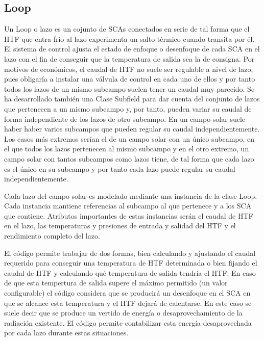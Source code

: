 \subsection{Loop}
\label{loop}

Un Loop o lazo es un cojunto de SCAs conectados en serie de tal forma que el HTF que entra frío al lazo experimenta un salto térmico cuando transita por él. El sistema de control ajusta el estado de enfoque o desenfoque de cada SCA en el lazo con el fin de conseguir que la temperatura de salida sea la de consigna. Por motivos de económicos, el caudal de HTF no suele ser regulable a nivel de lazo, pues obligaría a instalar una válvula de control en cada uno de ellos y por tanto todos los lazos de un mismo subcampo suelen tener un caudal muy parecido. Se ha desarrollado también una Clase Subfield para dar cuenta del conjunto de lazos que pertenecen a un mismo subcampo y, por tanto, pueden variar su caudal de forma independiente de los lazos de otro subcampo. En un campo solar suele haber haber varios subcampos que pueden regular su caudal independientemente. Los casos más extremos serían el de un campo solar con un único subcampo, en el que todos los lazos pertenecen al mismo subcampo y en el otro extremo, un campo solar con tantos subcampos como lazos tiene, de tal forma que cada lazo es el único en su subcampo y por tanto cada lazo puede regular su caudal independientemente. 

Cada lazo del campo solar es modelado mediante una instancia de la clase Loop. Cada instancia mantiene referencias al subcampo al que pertenece y a los SCA que contiene. Atributos importantes de estas instancias serán el caudal de HTF en el lazo, las temperaturas y presiones de entrada y salidad del HTF y el rendimiento completo del lazo. 

El código permite trabajar de dos formas, bien calculando y ajustando el caudal requerido para conseguir una temperatura de HTF determinada o bien fijando el caudal de HTF y calculando qué temperatura de salida tendría el HTF. En caso de que esta tempertura de salida supere el máximo permitido (un valor configurable) el código considera que se producirá un desenfoque en el SCA en que se alcance esta temperatura y el HTF dejará de calentarse. En este caso se suele decir que se produce un vertido de energía o desaprovechamiento de la radiación existente. El código permite contabilizar esta energía desaprovechada por cada lazo durante estas situaciones. 

